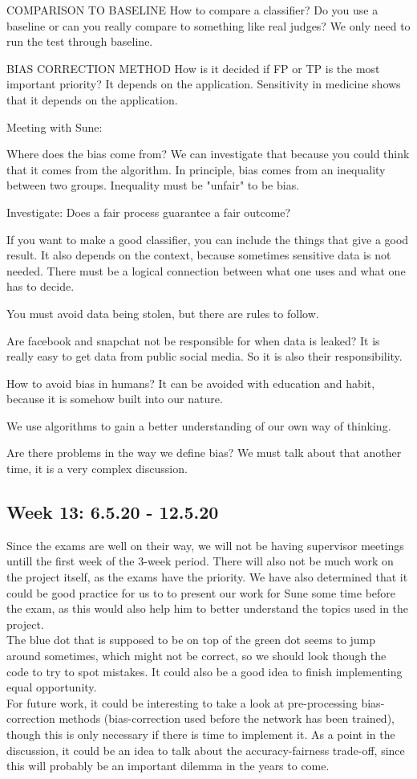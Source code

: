 \documentclass[11pt, fleqn]{article}
\begin{document}
COMPARISON TO BASELINE
How to compare a classifier? Do you use a baseline or can you really compare to something like real judges?
We only need to run the test through baseline.


BIAS CORRECTION METHOD
How is it decided if FP or TP is the most important priority?
It depends on the application.
Sensitivity in medicine shows that it depends on the application.


Meeting with Sune:

Where does the bias come from?
We can investigate that because you could think that it comes from the algorithm. In principle, bias comes from an inequality between two groups. Inequality must be "unfair" to be bias.

Investigate: Does a fair process guarantee a fair outcome?

If you want to make a good classifier, you can include the things that give a good result. It also depends on the context, because sometimes sensitive data is not needed.
There must be a logical connection between what one uses and what one has to decide.


You must avoid data being stolen, but there are rules to follow.

Are facebook and snapchat not be responsible for when data is leaked?
It is really easy to get data from public social media. So it is also their responsibility.

How to avoid bias in humans?
It can be avoided with education and habit, because it is somehow built into our nature.

We use algorithms to gain a better understanding of our own way of thinking.

Are there problems in the way we define bias?
We must talk about that another time, it is a very complex discussion.

\subsection*{Week 13: 6.5.20 - 12.5.20}
Since the exams are well on their way, we will not be having supervisor meetings untill the first week of the 3-week period. There will also not be much work on the project itself, as the exams have the priority. We have also determined that it could be good practice for us to to present our work for Sune some time before the exam, as this would also help him to better understand the topics used in the project. \\
The blue dot that is supposed to be on top of the green dot seems to jump around sometimes, which might not be correct, so we should look though the code to try to spot mistakes. It could also be a good idea to finish implementing equal opportunity. \\
For future work, it could be interesting to take a look at pre-processing bias-correction methods (bias-correction used before the network has been trained), though this is only necessary if there is time to implement it. As a point in the discussion, it could be an idea to talk about the accuracy-fairness trade-off, since this will probably be an important dilemma in the years to come.
\end{document}
